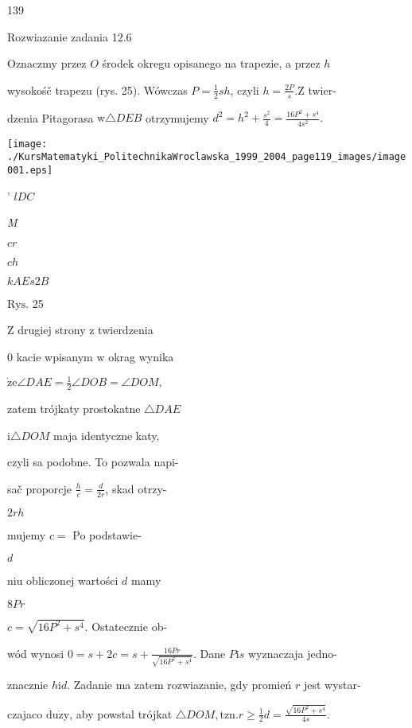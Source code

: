 \documentclass[a4paper,12pt]{article}
\begin{document}
139

Rozwiazanie zadania 12.6

Oznaczmy przez $O$ środek okregu opisanego na trapezie, a przez $h$

wysokośč trapezu (rys. 25). Wówczas $P= \displaystyle \frac{1}{2}sh$, czyli $h= \displaystyle \frac{2P}{s}. \mathrm{Z}$ twier-

dzenia Pitagorasa $\mathrm{w} \triangle DEB$ otrzymujemy $d^{2}=h^{2}+\displaystyle \frac{s^{2}}{4}=\frac{16P^{2}+s^{4}}{4s^{2}}.$
\begin{center}
\texttt{[image: ./KursMatematyki\_PolitechnikaWroclawska\_1999\_2004\_page119\_images/image001.eps]}
\end{center}
' $l D C$

{\it M}

$c r$

$c h$

$kA E s 2 B$

$\mathrm{R}\mathrm{y}\mathrm{s}$. 25

Z drugiej strony $\mathrm{z}$ twierdzenia

$0$ kacie wpisanym $\mathrm{w}$ okrag wynika

$\dot{\mathrm{z}}\mathrm{e} \angle DAE = \displaystyle \frac{1}{2}\angle DOB = \angle DOM,$

zatem trójkaty prostokatne $\triangle DAE$

$\mathrm{i} \triangle DOM$ maja identyczne katy,

czyli sa podobne. To pozwala napi-

sač proporcje $\displaystyle \frac{h}{c}= \displaystyle \frac{d}{2r}$, skad otrzy-

$2rh$

mujemy $c =$ Po podstawie-

$d$

niu obliczonej wartości $d$ mamy

$8Pr$

$c= \sqrt{16P^{2}+s^{4}}$. Ostatecznie ob-

wód wynosi $0=s+2c=s+\displaystyle \frac{16Pr}{\sqrt{16P^{2}+s^{4}}}$. Dane $P\mathrm{i}s$ wyznaczaja jedno-

znacznie $h\mathrm{i}d$. Zadanie ma zatem rozwiazanie, gdy promień $r$ jest wystar-

czajaco $\mathrm{d}\mathrm{u}\dot{\mathrm{z}}\mathrm{y}$, aby powstal trójkat $\triangle DOM, \mathrm{t}\mathrm{z}\mathrm{n}. r\displaystyle \geq\frac{1}{2}d=\frac{\sqrt{16P^{2}+s^{4}}}{4s}.$
\end{document}
